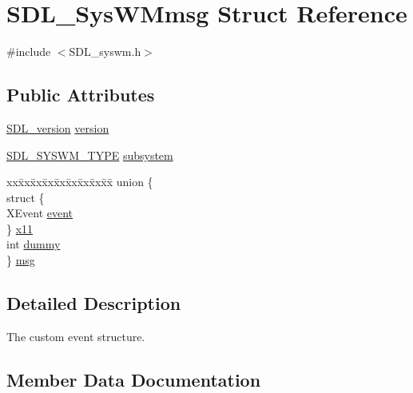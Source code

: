 \hypertarget{struct_s_d_l___sys_w_mmsg}{}\section{S\+D\+L\+\_\+\+Sys\+W\+Mmsg Struct Reference}
\label{struct_s_d_l___sys_w_mmsg}


{\ttfamily \#include $<$S\+D\+L\+\_\+syswm.\+h$>$}

\subsection*{Public Attributes}
\begin{DoxyCompactItemize}
\item 
\hyperlink{struct_s_d_l__version}{S\+D\+L\+\_\+version} \hyperlink{struct_s_d_l___sys_w_mmsg_a95f9aae58d18ee8fac556416b322a5fb}{version}
\item 
\hyperlink{_s_d_l__syswm_8h_a064c26598287280fff2a00d6758ac4f7}{S\+D\+L\+\_\+\+S\+Y\+S\+W\+M\+\_\+\+T\+Y\+PE} \hyperlink{struct_s_d_l___sys_w_mmsg_a7c3900af5ea797f1318fc77ee0ecd11b}{subsystem}
\item 
\begin{tabbing}
xx\=xx\=xx\=xx\=xx\=xx\=xx\=xx\=xx\=\kill
union \{\\
\>struct \{\\
\>\>XEvent \hyperlink{struct_s_d_l___sys_w_mmsg_ae32f04e3b3707a452cbb4ed416d56c64}{event}\\
\>\} \hyperlink{struct_s_d_l___sys_w_mmsg_ac60fef6de87deff6fe9cf4f49f9ff96c}{x11}\\
\>int \hyperlink{struct_s_d_l___sys_w_mmsg_a8faf13f90f2477157b42b631308cd900}{dummy}\\
\} \hyperlink{struct_s_d_l___sys_w_mmsg_a76c9fec05f26001312055dce455e0b76}{msg}\\

\end{tabbing}\end{DoxyCompactItemize}


\subsection{Detailed Description}
The custom event structure. 

\subsection{Member Data Documentation}
\mbox{\label{struct_s_d_l___sys_w_mmsg_a8faf13f90f2477157b42b631308cd900}} 
